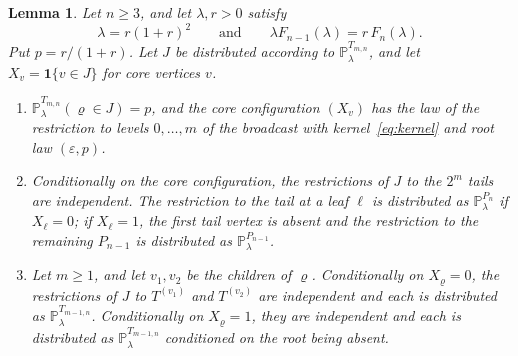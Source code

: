 \documentclass{amsart}
\newtheorem{lemma}[theorem]{Lemma}
\theoremstyle{definition}
\theoremstyle{remark}
\numberwithin{equation}{section}
\newcommand{\eps}{\varepsilon}
\newcommand{\Prob}{\mathbb{P}}
\begin{document}
\begin{lemma}\label{lem:broadcast}
Let $n\ge3$, and let $\lambda,r>0$ satisfy
\begin{equation}\label{eq:fixedpoint}
\lambda=r(1+r)^2\qquad\text{and}\qquad \lambda F_{n-1}(\lambda)=r\,F_n(\lambda).
\end{equation}
Put $p=r/(1+r)$. Let $J$ be distributed according to $\Prob^{T_{m,n}}_\lambda$, and let $X_v=\mathbf 1\{v\in J\}$ for core vertices $v$.
\begin{enumerate}[label=\textup{(\alph*)},leftmargin=*]
\item $\Prob^{T_{m,n}}_\lambda(\varrho\in J)=p$, and the core configuration $(X_v)$ has the law of the restriction to levels $0,\dots,m$ of the broadcast with kernel~\eqref{eq:kernel} and root law $(\eps,p)$.
\item Conditionally on the core configuration, the restrictions of $J$ to the $2^m$ tails are independent. The restriction to the tail at a leaf $\ell$ is distributed as $\Prob^{P_n}_\lambda$ if $X_\ell=0$; if $X_\ell=1$, the first tail vertex is absent and the restriction to the remaining $P_{n-1}$ is distributed as $\Prob^{P_{n-1}}_\lambda$.
\item Let $m\ge1$, and let $v_1,v_2$ be the children of $\varrho$. Conditionally on $X_\varrho=0$, the restrictions of $J$ to $T^{(v_1)}$ and $T^{(v_2)}$ are independent and each is distributed as $\Prob^{T_{m-1,n}}_\lambda$. Conditionally on $X_\varrho=1$, they are independent and each is distributed as $\Prob^{T_{m-1,n}}_\lambda$ conditioned on the root being absent.
\end{enumerate}
\end{lemma}
\end{document}
